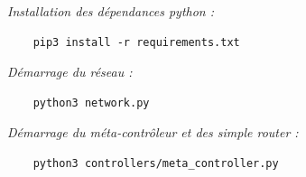 \documentclass[12pt,a4paper]{report}
\begin{document}
\emph{Installation des dépendances python :}

\begin{card}
\begin{verbatim}
    pip3 install -r requirements.txt
\end{verbatim}
\end{card}

\emph{Démarrage du réseau :}

\begin{card}
    \begin{verbatim}
    python3 network.py
\end{verbatim}
\end{card}


\emph{Démarrage du méta-contrôleur et des \emph{simple router} :}

\begin{card}
\begin{verbatim}
    python3 controllers/meta_controller.py
\end{verbatim}
\end{card}
\end{document}
